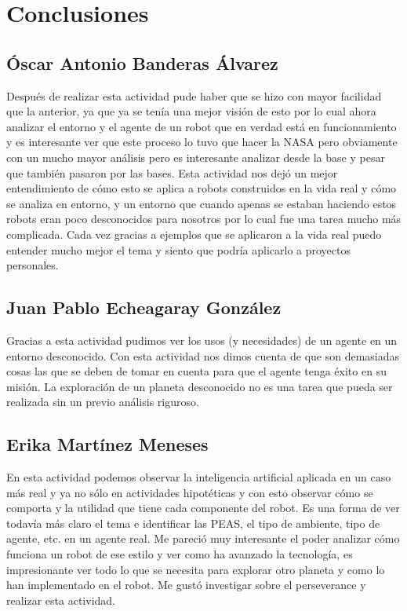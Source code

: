 \documentclass{article}
\begin{document}
    \section{Conclusiones}
        \subsection{Óscar Antonio Banderas Álvarez}
            Después de realizar esta actividad pude haber que se hizo con mayor facilidad que la anterior, ya que ya se tenía una mejor visión de esto por lo cual ahora analizar el entorno y el agente de un robot que en verdad está en funcionamiento y es interesante ver que este proceso lo tuvo que hacer la NASA pero obviamente con un mucho mayor análisis pero es interesante analizar desde la base y pesar que también pasaron por las bases. Esta actividad nos dejó un mejor entendimiento de cómo esto se aplica a robots construidos en la vida real y cómo se analiza en entorno, y un entorno que cuando apenas se estaban haciendo estos robots eran poco desconocidos para nosotros por lo cual fue una tarea mucho más complicada. Cada vez gracias a ejemplos que se aplicaron a la vida real puedo entender mucho mejor el tema y siento que podría aplicarlo a proyectos personales.

        \subsection{Juan Pablo Echeagaray González}
            Gracias a esta actividad pudimos ver los usos (y necesidades) de un agente en un entorno desconocido. Con esta actividad nos dimos cuenta de que son demasiadas cosas las que se deben de tomar en cuenta para que el agente tenga éxito en su misión. La exploración de un planeta desconocido no es una tarea que pueda ser realizada sin un previo análisis riguroso.

        \subsection{Erika Martínez Meneses}
            En esta actividad podemos observar la inteligencia artificial aplicada en un caso más real y ya no sólo en actividades hipotéticas y con esto observar cómo se comporta y la utilidad que tiene cada componente del robot. Es una forma de ver todavía más claro el tema e identificar las PEAS, el tipo de ambiente, tipo de agente, etc. en un agente real. Me pareció muy interesante el poder analizar cómo funciona un robot de ese estilo y ver como ha avanzado la tecnología, es impresionante ver todo lo que se necesita para explorar otro planeta y como lo han implementado en el robot. Me gustó investigar sobre el perseverance y realizar esta actividad.
            
\end{document}
